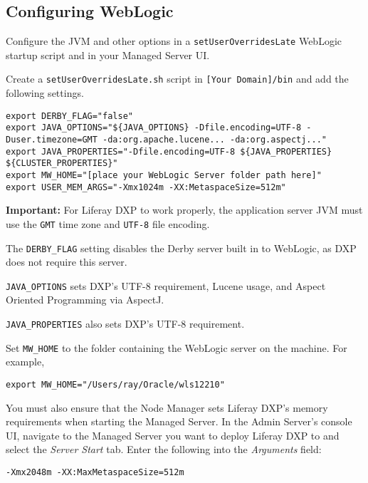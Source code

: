 \subsection{Configuring WebLogic}\label{configuring-weblogic}

Configure the JVM and other options in a \texttt{setUserOverridesLate}
WebLogic startup script and in your Managed Server UI.

Create a \texttt{setUserOverridesLate.sh} script in
\texttt{{[}Your\ Domain{]}/bin} and add the following settings.

\begin{verbatim}
export DERBY_FLAG="false"
export JAVA_OPTIONS="${JAVA_OPTIONS} -Dfile.encoding=UTF-8 -Duser.timezone=GMT -da:org.apache.lucene... -da:org.aspectj..."
export JAVA_PROPERTIES="-Dfile.encoding=UTF-8 ${JAVA_PROPERTIES} ${CLUSTER_PROPERTIES}"
export MW_HOME="[place your WebLogic Server folder path here]"
export USER_MEM_ARGS="-Xmx1024m -XX:MetaspaceSize=512m"
\end{verbatim}

\noindent\hrulefill

\textbf{Important:} For Liferay DXP to work properly, the application
server JVM must use the \texttt{GMT} time zone and \texttt{UTF-8} file
encoding.

\noindent\hrulefill

The \texttt{DERBY\_FLAG} setting disables the Derby server built in to
WebLogic, as DXP does not require this server.

\texttt{JAVA\_OPTIONS} sets DXP's UTF-8 requirement, Lucene usage, and
Aspect Oriented Programming via AspectJ.

\texttt{JAVA\_PROPERTIES} also sets DXP's UTF-8 requirement.

Set \texttt{MW\_HOME} to the folder containing the WebLogic server on
the machine. For example,

\begin{verbatim}
export MW_HOME="/Users/ray/Oracle/wls12210"
\end{verbatim}

You must also ensure that the Node Manager sets Liferay DXP's memory
requirements when starting the Managed Server. In the Admin Server's
console UI, navigate to the Managed Server you want to deploy Liferay
DXP to and select the \emph{Server Start} tab. Enter the following into
the \emph{Arguments} field:

\begin{verbatim}
-Xmx2048m -XX:MaxMetaspaceSize=512m
\end{verbatim}

